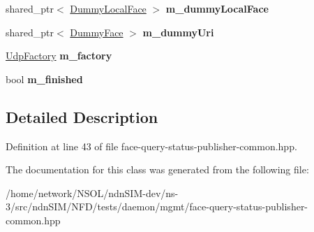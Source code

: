 \begin{DoxyCompactItemize}
\item 
shared\+\_\+ptr$<$ \hyperlink{classnfd_1_1tests_1_1DummyFaceImpl}{Dummy\+Local\+Face} $>$ {\bfseries m\+\_\+dummy\+Local\+Face}\hypertarget{classnfd_1_1tests_1_1FaceQueryStatusPublisherFixture_a43de6b3cc2e2f727c8dd5482ad0b6fae}{}\label{classnfd_1_1tests_1_1FaceQueryStatusPublisherFixture_a43de6b3cc2e2f727c8dd5482ad0b6fae}

\item 
shared\+\_\+ptr$<$ \hyperlink{classnfd_1_1tests_1_1DummyFaceImpl}{Dummy\+Face} $>$ {\bfseries m\+\_\+dummy\+Uri}\hypertarget{classnfd_1_1tests_1_1FaceQueryStatusPublisherFixture_a4759ce0cdcdde6e9d9c77484ec2e7b81}{}\label{classnfd_1_1tests_1_1FaceQueryStatusPublisherFixture_a4759ce0cdcdde6e9d9c77484ec2e7b81}

\item 
\hyperlink{classnfd_1_1UdpFactory}{Udp\+Factory} {\bfseries m\+\_\+factory}\hypertarget{classnfd_1_1tests_1_1FaceQueryStatusPublisherFixture_a4c6055d432823ad00a04c36821031513}{}\label{classnfd_1_1tests_1_1FaceQueryStatusPublisherFixture_a4c6055d432823ad00a04c36821031513}

\item 
bool {\bfseries m\+\_\+finished}\hypertarget{classnfd_1_1tests_1_1FaceQueryStatusPublisherFixture_add204024424351101558b625509d71ea}{}\label{classnfd_1_1tests_1_1FaceQueryStatusPublisherFixture_add204024424351101558b625509d71ea}

\end{DoxyCompactItemize}


\subsection{Detailed Description}


Definition at line 43 of file face-\/query-\/status-\/publisher-\/common.\+hpp.



The documentation for this class was generated from the following file\+:\begin{DoxyCompactItemize}
\item 
/home/network/\+N\+S\+O\+L/ndn\+S\+I\+M-\/dev/ns-\/3/src/ndn\+S\+I\+M/\+N\+F\+D/tests/daemon/mgmt/face-\/query-\/status-\/publisher-\/common.\+hpp\end{DoxyCompactItemize}
